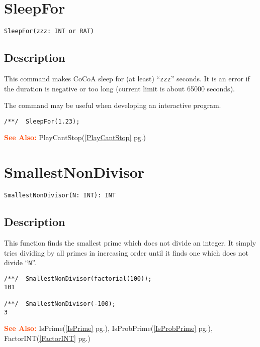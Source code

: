\documentclass[a4paper]{mybook}
\newenvironment{command}{}{} %
\newcommand\SeeAlso{\par\textcolor{OrangeRed}{\textbf{\large See Also: }}}
\begin{document}
\section{SleepFor}
\label{SleepFor}
\begin{command} %


\begin{Verbatim}[label=syntax, rulecolor=\color{MidnightBlue},
frame=single]
SleepFor(zzz: INT or RAT)
\end{Verbatim}


\subsection*{Description}

This command makes CoCoA sleep for (at least) ``\verb&zzz&'' seconds.
It is an error if the duration is negative or too long
(current limit is about 65000 seconds).
\par 
The command may be useful when developing an interactive program.
\begin{Verbatim}[label=example, rulecolor=\color{PineGreen}, frame=single]
/**/  SleepFor(1.23);
\end{Verbatim}


\SeeAlso %
  PlayCantStop(\ref{PlayCantStop} pg.\pageref{PlayCantStop})
\end{command} %

\section{SmallestNonDivisor}
\label{SmallestNonDivisor}
\begin{command} %


\begin{Verbatim}[label=syntax, rulecolor=\color{MidnightBlue},
frame=single]
SmallestNonDivisor(N: INT): INT
\end{Verbatim}


\subsection*{Description}

This function finds the smallest prime which does not divide an integer.
It simply tries dividing by all primes in increasing order until it finds
one which does not divide ``\verb&N&''.
\begin{Verbatim}[label=example, rulecolor=\color{PineGreen}, frame=single]
/**/  SmallestNonDivisor(factorial(100));
101

/**/  SmallestNonDivisor(-100);
3
\end{Verbatim}


\SeeAlso %
  IsPrime(\ref{IsPrime} pg.\pageref{IsPrime}), 
    IsProbPrime(\ref{IsProbPrime} pg.\pageref{IsProbPrime}), 
    FactorINT(\ref{FactorINT} pg.\pageref{FactorINT})
\end{command} %
\end{document}
